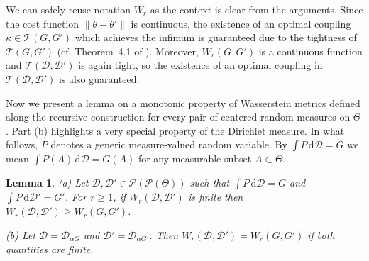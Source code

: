 \documentclass[MSNbibl,number,citesort]{arxbj}
\def\comment{}
\newtheorem{lemma}{Lemma}[section]
\newcommand{\Dcal}{\mathcal{D}}
\newcommand{\Pcal}{\mathscr{P}}
\newcommand{\TPlan}{\mathcal{T}}
\newcommand{\DP}{\mathscr{D}}
\newcommand{\W}{W}
\newcommand{\Wr}{W_r}
\newcommand{\Wcalr}{\W_r}
\begin{document}
We can safely reuse notation $\Wr$ as the context is clear from
the arguments.
Since the cost function $\|\theta-\theta'\|$ is continuous,
the existence of an optimal coupling $\kappa\in\TPlan(G,G')$ which
achieves the infimum
is guaranteed due to the tightness of $\TPlan(G,G')$
(cf. Theorem~4.1 of \cite{Villani-08}).
Moreover, $\Wr(G,G')$ is a continuous function and $\TPlan(\Dcal
,\Dcal')$
is again tight, so the existence of an optimal coupling in $\TPlan
(\Dcal
,\Dcal')$
is also guaranteed.

Now we present a lemma on a monotonic property of
Wasserstein metrics defined along the recursive construction
for every pair of centered random measures on $\Theta$. Part (b)
highlights a very special property of the Dirichlet measure.
In what follows, $P$ denotes a generic measure-valued random variable.
By $\int P \,\mathrm{d}\Dcal= G$ we mean $\int P(A) \,\mathrm
{d}\Dcal= G(A)$
for any measurable subset $A \subset\Theta$.

%
\begin{lemma}
\label{Lem-dp-hierarchy}
%
%
\textup{(a)} Let $\Dcal,\Dcal' \in\Pcal(\Pcal(\Theta))$ such that
$\int
P \,\mathrm{d}\Dcal= G$
and $\int P \,\mathrm{d}\Dcal' = G'$. For $r \geq1$, if $\Wr(\Dcal
,\Dcal')$
is finite
then $\Wcalr(\Dcal,\Dcal') \geq\Wr(G,G')$.

\textup{(b)} Let $\Dcal= \DP_{\alpha G}$ and $\Dcal' = \DP_{\alpha G'}$.
Then $\Wcalr(\Dcal,\Dcal') = \Wr(G,G')$ if both quantities are finite.
%
\end{lemma}

%
\end{document}
